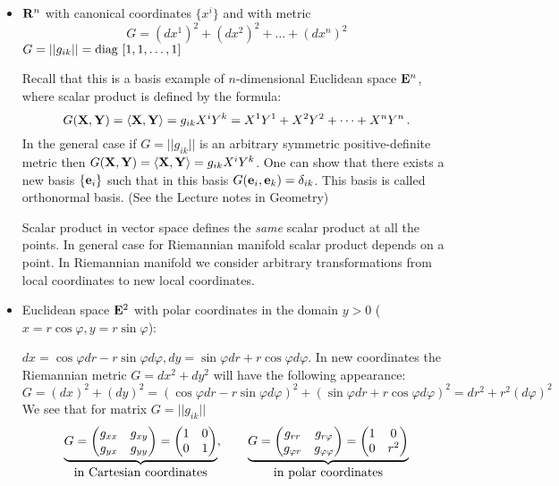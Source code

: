 \documentclass[12pt]{article}
\theoremstyle{theorem}
\numberwithin{equation}{section}
\begin{document}
   \begin{itemize}

	   \item


   ${\bf R}^n$ with canonical coordinates $\{x^i\}$ and with metric
               $$
           G=(dx^1)^2+(dx^2)^2+\dots+(dx^n)^2
               $$
           $G=||g_{ik}||=\rm diag\,\, [1,1,\dots,1]$

Recall that this is a basis example of $n$-dimensional 
Euclidean space ${\bf E}^n$, where scalar product
is defined by the formula:
              $$
     G({\bf X},{\bf Y})=\langle{\bf X},{\bf Y}\rangle=g_{ik}X^iY^k=X^1Y^1+X^2Y^2+\dots+X^nY^n\,.
              $$
In the general case if $G=||g_{ik}||$ is an
arbitrary symmetric positive-definite metric then
                $
            G({\bf X},{\bf Y})=\langle{\bf X},{\bf Y}\rangle=g_{ik}X^iY^k$.
One can show that there exists a new basis $\{{\bf e}_i\}$ such that in this basis
              $
              G({\bf e}_i,{\bf e}_k)=\delta_{ik}$.
This basis is called orthonormal basis. (See the Lecture notes in Geometry)



Scalar product in vector space defines the {\it same}
scalar product at all the points. In general case
for Riemannian manifold scalar product depends on a point.
In Riemannian manifold we consider arbitrary transformations from
local coordinates to new local coordinates.


\item  Euclidean space ${\bf E}^2$ with polar coordinates in the domain $y>0$
($x=r\cos\varphi, y=r\sin\varphi$):

   $dx=\cos\varphi dr-r\sin\varphi d\varphi, dy=\sin\varphi dr+r\cos\varphi d\varphi$.
  In new coordinates the Riemannian metric $G=dx^2+dy^2$ will
have the following appearance:
             $$
        G=(dx)^2+(dy)^2=(\cos\varphi dr-r\sin\varphi d\varphi)^2+(\sin\varphi dr+r\cos\varphi d\varphi)^2=
         dr^2+r^2(d\varphi)^2
            $$
   We see that for matrix    $G=||g_{ik}||$
             \begin{equation*}
                 \underbrace{G=
           \begin{pmatrix}        g_{xx} &g_{xy}\cr  g_{yx} &g_{yy} \end{pmatrix}=
      \begin{pmatrix}    1 &0\cr  0 &1\cr
\end{pmatrix}}_{\hbox{in Cartesian coordinates}},\qquad
                 \underbrace
                 {G=
      \begin{pmatrix}g_{rr} &g_{r\varphi}\cr g_{\varphi r}
&g_{\varphi\varphi}\end{pmatrix}=
      \begin{pmatrix}1 &0\cr 0 &r^2\end{pmatrix}}_ {\hbox{in polar coordinates}}
             \end{equation*}


\end{itemize}
\end{document}
